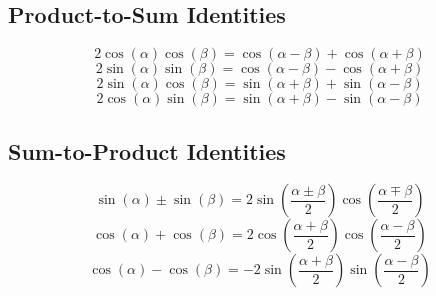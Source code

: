 	\subsection{Product-to-Sum Identities} \label{subsec:Product-to-Sum Identities}
		\begin{equation} \label{eq:Cos-Cos Product-to-Sum Identity}
			2 \cos \left( \alpha \right) \cos \left( \beta \right) = \cos \left( \alpha - \beta \right) + \cos \left( \alpha + \beta \right)
		\end{equation}
		\begin{equation} \label{eq:Sin-Sin Product-to-Sum Identity}
			2 \sin \left( \alpha \right) \sin \left( \beta \right) = \cos \left( \alpha - \beta \right) - \cos \left( \alpha + \beta \right)
		\end{equation}
		\begin{equation} \label{eq:Sin-Cos Product-to-Sum Identity}
			2 \sin \left( \alpha \right) \cos \left( \beta \right) = \sin \left( \alpha + \beta \right) + \sin \left( \alpha - \beta \right)
		\end{equation}
		\begin{equation} \label{eq:Cos-Sin Product-to-Sum Identity}
			2 \cos \left( \alpha \right) \sin \left( \beta \right) = \sin \left( \alpha + \beta \right) - \sin \left( \alpha - \beta \right)
		\end{equation}
	
	\subsection{Sum-to-Product Identities} \label{subsec:Sum-to-Product Identities}
		\begin{equation} \label{eq:Sin Sum-to-Product Identity}
			\sin \left( \alpha \right) \pm \sin \left( \beta \right) = 2 \sin \left( \frac{ \alpha \pm \beta}{2} \right) \cos \left( \frac{\alpha \mp \beta}{2} \right)
		\end{equation}
		\begin{equation} \label{eq:Cos+Cos Sum-to-Product Identity}
			\cos \left( \alpha \right) + \cos \left( \beta \right) = 2 \cos \left( \frac{\alpha + \beta}{2} \right) \cos \left( \frac{\alpha - \beta}{2} \right)
		\end{equation}
		\begin{equation} \label{eq:Cos-Cos Sum-to-Product Identity}
			\cos \left( \alpha \right) - \cos \left( \beta \right) = -2 \sin \left( \frac{\alpha + \beta}{2} \right) \sin \left( \frac{\alpha - \beta}{2} \right)
		\end{equation}
	
